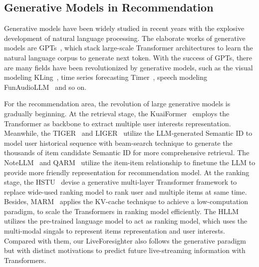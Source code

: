 \subsection{Generative Models in Recommendation}
Generative models have been widely studied in recent years with the explosive development of natural language processing.
%
The elaborate works of generative models are GPTs~\cite{achiam2023gpt, bai2023qwen}, which stack large-scale Transformer architectures to learn the natural language corpus to generate next token.
%
With the success of GPTs, there are many fields have been revolutionized by generative models, such as the visual modeling KLing~\cite{tian2024videotetris}, time series forecasting Timer~\cite{liutimer}, speech modeling FunAudioLLM~\cite{an2024funaudiollm} and so on. 
%

For the recommendation area, the revolution of large generative models is gradually beginning.
%
At the retrieval stage, the KuaiFormer~\cite{kuaiformer} employs the Transformer as backbone to extract multiple user interests representation.
%
Meanwhile, the TIGER~\cite{tiger} and LIGER~\cite{yang2024unifying} utilize the LLM-generated Semantic ID to model user historical sequence with beam-search technique to generate the thousands of item candidate Semantic ID for more comprehensive retrieval.
%
The NoteLLM~\cite{zhang2024notellm} and QARM~\cite{luo2024qarm} utilize the item-item relationship to finetune the LLM to provide more friendly representation for recommendation model.
%
At the ranking stage, the HSTU~\cite{zhai2024actions} devise a generative multi-layer Transformer framework to replace wide-used ranking model to rank user and multiple items at same time.
%
Besides, MARM~\cite{lv2024marm} applies the KV-cache technique to achieve a low-computation paradigm, to scale the Transformers in ranking model efficiently.
%
The HLLM~\cite{chen2024hllm} utilizes the pre-trained language model to act as ranking model, which uses the multi-modal singals to represent items representation and user interests.
%
Compared with them, our LiveForesighter also follows the generative paradigm but with distinct motivations to predict future live-streaming information with Transformers.
%